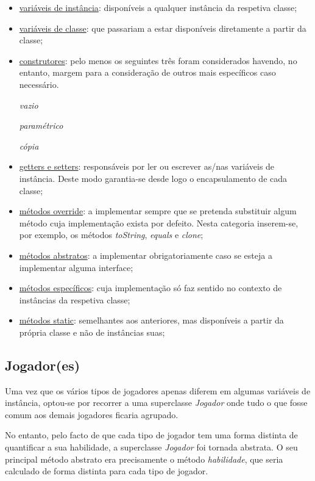 \documentclass[11pt]{article}
\begin{document}
\begin{itemize}
\item \underline{variáveis de instância}: disponíveis a qualquer instância da respetiva classe;

\item \underline{variáveis de classe}: que passariam a estar disponíveis diretamente a partir da classe;

\item \underline{construtores}: pelo menos os seguintes três foram considerados havendo, no entanto, margem para a consideração de outros mais específicos caso necessário.

\subitem \textit{vazio}

\subitem \textit{paramétrico}

\subitem \textit{cópia}

\item \underline{getters e setters}: responsáveis por ler ou escrever as/nas variáveis de instância. Deste modo garantia-se desde logo o encapsulamento de cada classe;
 
\item \underline{métodos override}: a implementar sempre que se pretenda substituir algum método cuja implementação exista por defeito. Nesta categoria inserem-se, por exemplo, os métodos \textit{toString}, \textit{equals} e \textit{clone};

\item \underline{métodos abstratos}: a implementar obrigatoriamente caso se esteja a implementar alguma interface;

\item \underline{métodos específicos}: cuja implementação só faz sentido no contexto de instâncias da respetiva classe;

\item \underline{métodos static}: semelhantes aos anteriores, mas disponíveis a partir da própria classe e não de instâncias suas;

\end{itemize}

\subsection{Jogador(es)}
Uma vez que os vários tipos de jogadores apenas diferem em algumas variáveis de instância, optou-se por recorrer a uma superclasse \textit{Jogador} onde tudo o que fosse comum aos demais jogadores ficaria agrupado.

No entanto, pelo facto de que cada tipo de jogador tem uma forma distinta de quantificar a sua habilidade, a superclasse \textit{Jogador} foi tornada abstrata. O seu principal método abstrato era precisamente o método \textit{habilidade}, que seria calculado de forma distinta para cada tipo de jogador.
\end{document}
